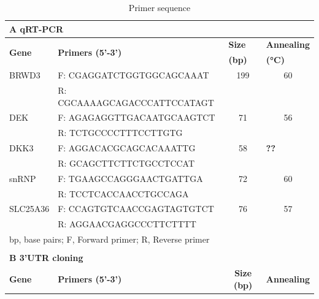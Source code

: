 \begin{table}[htbp]
  \centering
  \caption{Primer sequence}
    \begin{tabular}{p{4.665em}lll}
    \multicolumn{4}{p{32.16em}}{\textbf{A qRT-PCR}} \\
    \hline\hline
    \multirow{2}[2]{*}{\textbf{Gene}} & \multicolumn{1}{l}{\multirow{2}[2]{*}{\textbf{Primers (5’-3’)}}} & \multicolumn{1}{p{2.165em}}{\textbf{Size}} & \multicolumn{1}{p{4.61em}}{\textbf{Annealing}} \\
    \multicolumn{1}{r}{} &       & \multicolumn{1}{p{2.165em}}{\textbf{(bp)}} & \multicolumn{1}{p{4.61em}}{\textbf{(°C)}} \\
    \hline
    BRWD3 & \multicolumn{1}{p{20.72em}}{F: CGAGGATCTGGTGGCAGCAAAT} & \multicolumn{1}{c}{199} & \multicolumn{1}{c}{60} \\
    \multicolumn{1}{r}{} & \multicolumn{1}{p{20.72em}}{R: CGCAAAAGCAGACCCATTCCATAGT} &       &  \\
    DEK   & \multicolumn{1}{p{20.72em}}{F: AGAGAGGTTGACAATGCAAGTCT} & \multicolumn{1}{c}{71} & \multicolumn{1}{c}{56} \\
    \multicolumn{1}{r}{} & \multicolumn{1}{p{20.72em}}{R: TCTGCCCCTTTCCTTGTG} &       &  \\
    DKK3  & \multicolumn{1}{p{20.72em}}{F: AGGACACGCAGCACAAATTG} & \multicolumn{1}{c}{58} & \multicolumn{1}{p{4.61em}}{\textcolor[rgb]{ 1,  0,  1}{\textbf{??}}} \\
    \multicolumn{1}{r}{} & \multicolumn{1}{p{20.72em}}{R: GCAGCTTCTTCTGCCTCCAT} &       &  \\
    snRNP & \multicolumn{1}{p{20.72em}}{F: TGAAGCCAGGGAACTGATTGA} & \multicolumn{1}{c}{72} & \multicolumn{1}{c}{60} \\
    \multicolumn{1}{r}{} & \multicolumn{1}{p{20.72em}}{R: TCCTCACCAACCTGCCAGA} &       &  \\
    SLC25A36 & \multicolumn{1}{p{20.72em}}{F: CCAGTGTCAACCGAGTAGTGTCT} & \multicolumn{1}{c}{76} & \multicolumn{1}{c}{57} \\
    \multicolumn{1}{r}{} & \multicolumn{1}{p{20.72em}}{R: AGGAACGAGGCCCTTCTTTT} &       &  \\
    \hline\hline
    \multicolumn{4}{p{32.16em}}{bp, base pairs; F, Forward primer; R, Reverse primer} \\
    \multicolumn{1}{r}{} &       &       &  \\
    \multicolumn{4}{p{32.16em}}{\textbf{B 3’UTR cloning}} \\
    \hline\hline
    \multirow{2}[2]{*}{\textbf{Gene}} & \multicolumn{1}{l}{\multirow{2}[2]{*}{\textbf{Primers (5’-3’)}}} & \multicolumn{1}{c}{\multirow{2}[2]{*}{\textbf{Size (bp)}}} & \multicolumn{1}{p{4.61em}}{\textbf{Annealing}} \\

\end{tabular}
\end{table}
